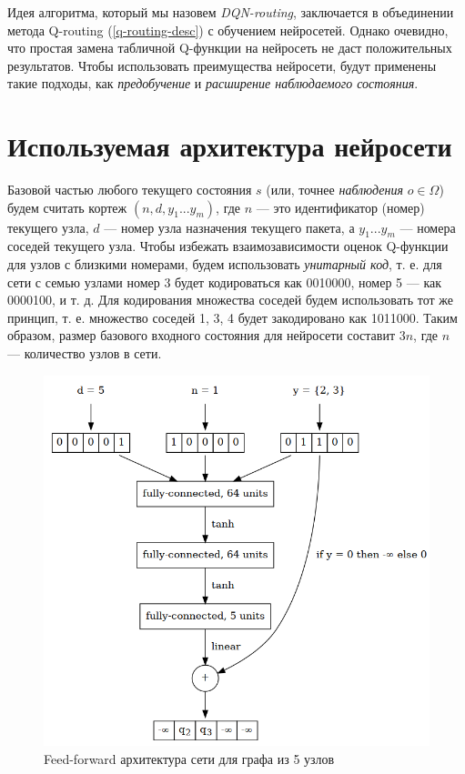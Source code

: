 \documentclass[specification, annotation]{itmo-student-thesis}
\begin{document}
Идея алгоритма, который мы назовем \textit{DQN-routing}, заключается в
объединении метода Q-routing (\ref{q-routing-desc}) с обучением нейросетей.
Однако очевидно, что простая замена табличной Q-функции на нейросеть не даст
положительных результатов. Чтобы использовать преимущества нейросети, будут
применены такие подходы, как \textit{предобучение} и \textit{расширение
  наблюдаемого состояния}.

\section{Используемая архитектура нейросети}

Базовой частью любого текущего состояния $s$ (или, точнее \textit{наблюдения}
$o \in \Omega$) будем считать кортеж $(n, d, y_1 ... y_m)$, где $n$ --- это
идентификатор (номер) текущего узла, $d$ --- номер узла назначения текущего
пакета, а $y_1 ... y_m$ --- номера соседей текущего узла. Чтобы избежать
взаимозависимости оценок Q-функции для узлов с близкими номерами, будем
использовать \textit{унитарный код}, т. е. для сети с семью узлами номер 3 будет
кодироваться как 0010000, номер 5 --- как 0000100, и т. д. Для кодирования
множества соседей будем использовать тот же принцип, т. е. множество соседей 1,
3, 4 будет закодировано как 1011000. Таким образом, размер базового входного
состояния для нейросети составит $3n$, где $n$ --- количество узлов в сети.

\begin{figure}[!h]
  \caption{Feed-forward архитектура сети для графа из 5 узлов}\label{nn-pic-ff}
  \centering
  \includegraphics[scale=0.5]{nn-1}
\end{figure}
\end{document}
